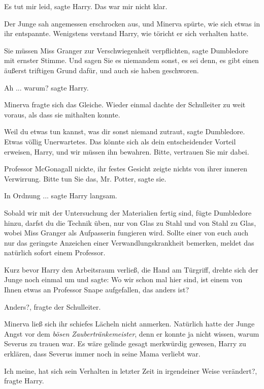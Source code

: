 \glqq{}Es tut mir leid\grqq{}, sagte Harry. \glqq{}Das war mir nicht
klar.\grqq{}

Der Junge sah angemessen erschrocken aus, und Minerva spürte, wie sich etwas in
ihr entspannte. Wenigstens verstand Harry, wie töricht er sich verhalten hatte.

\glqq{}Sie müssen Miss Granger zur Verschwiegenheit verpflichten\grqq{}, sagte
Dumbledore mit ernster Stimme. \glqq{}Und sagen Sie es niemandem sonst, es sei
denn, es gibt einen äußerst triftigen Grund dafür, und auch sie haben
geschworen.\grqq{}

\glqq{}Ah ... warum?\grqq{} sagte Harry.

Minerva fragte sich das Gleiche. Wieder einmal dachte der Schulleiter zu weit
voraus, als dass sie mithalten konnte.

\glqq{}Weil du etwas tun kannst, was dir sonst niemand zutraut\grqq{}, sagte
Dumbledore. \glqq{}Etwas völlig Unerwartetes. Das könnte sich als dein
entscheidender Vorteil erweisen, Harry, und wir müssen ihn bewahren. Bitte,
vertrauen Sie mir dabei.\grqq{}

Professor McGonagall nickte, ihr festes Gesicht zeigte nichts von ihrer inneren
Verwirrung. \glqq{}Bitte tun Sie das, Mr. Potter\grqq{}, sagte sie.

\glqq{}In Ordnung ...\grqq{} sagte Harry langsam.

\glqq{}Sobald wir mit der Untersuchung der Materialien fertig sind\grqq{}, fügte
Dumbledore hinzu, \glqq{}darfst du die Technik üben, nur von Glas zu Stahl und
von Stahl zu Glas, wobei Miss Granger als Aufpasserin fungieren wird. Sollte
einer von euch auch nur das geringste Anzeichen einer Verwandlungskrankheit
bemerken, meldet das natürlich sofort einem Professor.\grqq{}

Kurz bevor Harry den Arbeitsraum verließ, die Hand am Türgriff, drehte sich der
Junge noch einmal um und sagte: \glqq{}Wo wir schon mal hier sind, ist einem von
Ihnen etwas an Professor Snape aufgefallen, das anders ist?\grqq{}

\glqq{}Anders?\grqq{}, fragte der Schulleiter.

Minerva ließ sich ihr schiefes Lächeln nicht anmerken. Natürlich hatte der Junge
Angst vor dem \emph{ \glqq{}bösen Zaubertränkemeister\grqq{}}, denn er konnte ja
nicht wissen, warum Severus zu trauen war. Es wäre gelinde gesagt merkwürdig
gewesen, Harry zu erklären, dass Severus immer noch in seine Mama verliebt
war.

\glqq{}Ich meine, hat sich sein Verhalten in letzter Zeit in irgendeiner Weise
verändert?\grqq{}, fragte Harry.

